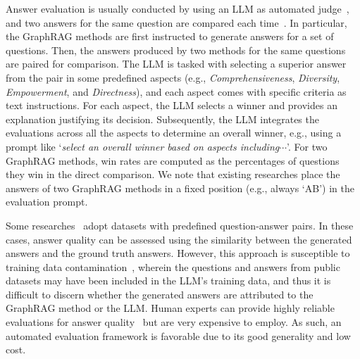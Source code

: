 Answer evaluation is usually conducted by using an LLM as automated judge~\cite{chang2024survey,bohnet2022attributed,kocmi2023large,lin2023llm,chiang2023can}, and two answers for the same question are compared each time~\cite{wang2024evaluating,lyu2024crud,salemi2024evaluating,chen2024benchmarking,han2024rag,hu2024rag}. In particular, the GraphRAG methods are first instructed to generate answers for a set of questions. Then, the answers produced by two methods for the same questions are paired for comparison. The LLM  is tasked with selecting a superior answer from the pair in some predefined aspects (e.g., \textit{Comprehensiveness}, \textit{Diversity}, \textit{Empowerment}, and \textit{Directness}), and each aspect comes with specific criteria as text instructions. For each aspect, the LLM selects a winner and provides an explanation justifying its decision. Subsequently, the LLM integrates the evaluations across all the aspects to determine an overall winner, e.g., using a prompt like `\textit{select an overall winner based on aspects including$\cdots$}'. For two GraphRAG methods, win rates are computed as the percentages of questions they win in the direct comparison. We note that existing researches place the answers of two GraphRAG methods in a fixed position (e.g., always `AB') in the evaluation prompt.

Some researches~\cite{fastgraphrag2024,jin2024graph} adopt datasets with predefined question-answer pairs. In these cases, answer quality can be assessed using  the similarity between the generated answers and the ground truth answers. 
However, this approach is susceptible to training data contamination~\cite{zhou2024trustworthiness}, wherein the questions and answers from public datasets may have been included in the LLM's training data, and thus it is difficult to discern whether the generated answers are  attributed to the GraphRAG method or the LLM.
Human experts can provide highly reliable evaluations for answer quality~\cite{tseng2024expert} but are very expensive to employ. As such, an automated evaluation framework is favorable due to its good generality and low cost. 



